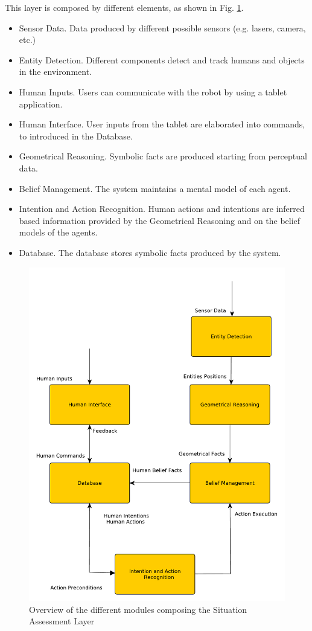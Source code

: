 This layer is composed by different elements, as shown in Fig. \ref{fig:situation_assessment-situation_assessment_overview}.
\begin{itemize}
\item Sensor Data. Data produced by different possible sensors (e.g. lasers, camera, etc.)
\item Entity Detection. Different components detect and track humans and objects in the environment.
\item Human Inputs. Users can communicate with the robot by using a tablet application.
\item Human Interface. User inputs from the tablet are elaborated into commands, to introduced in the Database.
\item Geometrical Reasoning. Symbolic facts are produced starting from perceptual data.
\item Belief Management. The system maintains a mental model of each agent.
\item Intention and Action Recognition. Human actions and intentions are inferred based information provided by the Geometrical Reasoning and on the belief models of the agents.
\item Database. The database stores symbolic facts produced by the system.
\end{itemize}


 \begin{figure}[h!]
	\centering
	\includegraphics[scale=0.45]{img/situation_assessment/situation_assessment_overview}
	\caption{Overview of the different modules composing the Situation Assessment Layer}
	\label{fig:situation_assessment-situation_assessment_overview}
\end{figure}


